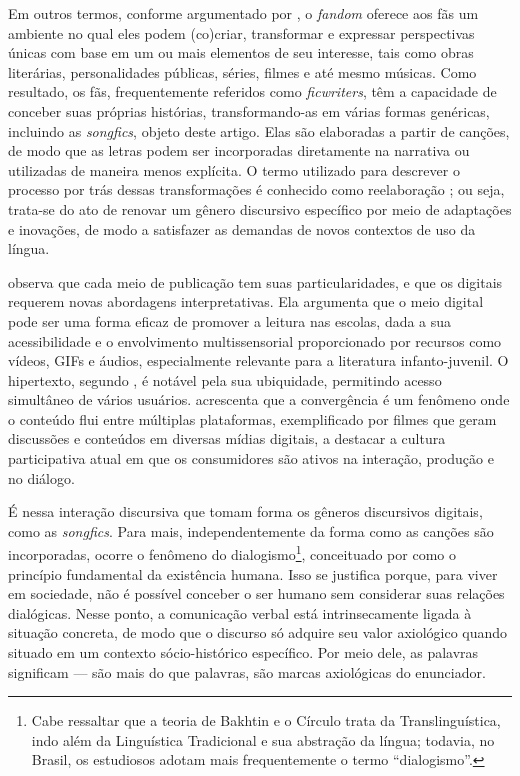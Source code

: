 Em outros termos, conforme argumentado por \textcite{ribeiro2019}, o
\emph{fandom} oferece aos fãs um ambiente no qual eles podem (co)criar,
transformar e expressar perspectivas únicas com base em um ou mais
elementos de seu interesse, tais como obras literárias, personalidades
públicas, séries, filmes e até mesmo músicas. Como resultado, os fãs,
frequentemente referidos como \emph{ficwriters}, têm a capacidade de
conceber suas próprias histórias, transformando-as em várias formas
genéricas, incluindo as \emph{songfics}, objeto deste artigo. Elas são
elaboradas a partir de canções, de modo que as letras podem ser
incorporadas diretamente na narrativa ou utilizadas de maneira menos
explícita. O termo utilizado para descrever o processo por trás dessas
transformações é conhecido como reelaboração \cite{araujo2009,azevedo2022,zavam2012}; ou seja, trata-se do ato de renovar um gênero
discursivo específico por meio de adaptações e inovações, de modo a
satisfazer as demandas de novos contextos de uso da língua.

\textcite{damiani2016} observa que cada meio de publicação tem suas
particularidades, e que os digitais requerem novas abordagens
interpretativas. Ela argumenta que o meio digital pode ser uma forma
eficaz de promover a leitura nas escolas, dada a sua acessibilidade e o
envolvimento multissensorial proporcionado por recursos como vídeos,
GIFs e áudios, especialmente relevante para a literatura
infanto-juvenil. O hipertexto, segundo \textcite{xavier2002}, é notável pela sua
ubiquidade, permitindo acesso simultâneo de vários usuários. \textcite{jenkins2009} acrescenta que a convergência é um fenômeno onde o conteúdo flui
entre múltiplas plataformas, exemplificado por filmes que geram
discussões e conteúdos em diversas mídias digitais, a destacar a cultura
participativa atual em que os consumidores são ativos na interação,
produção e no diálogo.

É nessa interação discursiva que tomam forma os gêneros discursivos
digitais, como as \emph{songfics}. Para mais, independentemente da forma
como as canções são incorporadas, ocorre o fenômeno do
dialogismo\footnote{Cabe ressaltar que a teoria de Bakhtin e o Círculo
  trata da Translinguística, indo além da Linguística Tradicional e sua
  abstração da língua; todavia, no Brasil, os estudiosos adotam mais
  frequentemente o termo ``dialogismo''.}, conceituado por \textcite{bakhtin2010} como o princípio fundamental da existência humana. Isso se
justifica porque, para viver em sociedade, não é possível conceber o ser
humano sem considerar suas relações dialógicas. Nesse ponto, a
comunicação verbal está intrinsecamente ligada à situação concreta, de
modo que o discurso só adquire seu valor axiológico quando situado em um
contexto sócio-histórico específico. Por meio dele, as palavras
significam --- são mais do que palavras, são marcas axiológicas do
enunciador.

